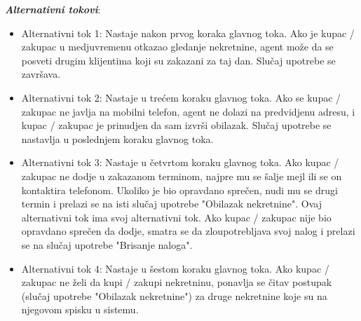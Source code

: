 \documentclass[20pt]{article}
\begin{document}
\textbf{\textit{Alternativni tokovi}}: 
\begin{itemize}
    \item Alternativni tok 1: Nastaje nakon prvog koraka glavnog toka.  Ako je kupac / zakupac u medjuvremenu otkazao gledanje nekretnine, agent mo\v ze da se posveti drugim klijentima koji su zakazani za taj dan. Slu\v caj upotrebe se zavr\v sava.
    \item Alternativni tok 2: Nastaje u tre\' cem koraku glavnog toka. Ako se kupac / zakupac ne javlja na mobilni telefon, agent ne dolazi na predvidjenu adresu, i kupac / zakupac je prinudjen da sam izvr\v si obilazak. Slu\v caj upotrebe se nastavlja u poslednjem koraku glavnog toka.
    \item Alternativni tok 3:  Nastaje u \v cetvrtom koraku glavnog toka. Ako kupac / zakupac ne dodje u zakazanom terminom, najpre mu se \v salje mejl ili se on kontaktira telefonom. Ukoliko je bio opravdano spre\v cen, nudi mu se drugi termin i prelazi se na isti slu\v caj upotrebe "Obilazak nekretnine". Ovaj alternativni tok ima svoj alternativni tok. Ako kupac / zakupac nije bio opravdano spre\v cen da dodje, smatra se da zloupotrebljava svoj nalog i prelazi se na slu\v caj upotrebe "Brisanje naloga". 
    \item Alternativni tok 4: Nastaje u \v sestom koraku glavnog toka. Ako kupac / zakupac ne \v zeli da kupi / zakupi nekretninu, ponavlja se \v citav postupak (slu\v caj upotrebe "Obilazak nekretnine") za druge nekretnine koje su na njegovom spisku u sistemu.  
\end{itemize}
\end{document}
